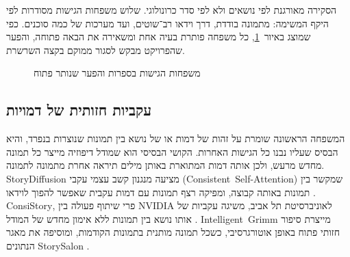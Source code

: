 הסקירה מאורגנת לפי נושאים ולא לפי סדר כרונולוגי. שלוש משפחות הגישות מסודרות לפי היקף המשימה: מתמונה בודדת, דרך וידאו רב־שוטים, ועד מערכות של כמה סוכנים. כפי שמוצג באיור~\ref{fig:ch3-families}, כל משפחה פותרת בעיה אחת ומשאירה את הבאה פתוחה, והפער שהפרויקט מבקש לסגור ממוקם בקצה השרשרת.

\begin{figure}[h]
  \centering
  \caption{משפחות הגישות בספרות והפער שנותר פתוח}
  \label{fig:ch3-families}
\end{figure}

\subsection{עקביות חזותית של דמויות}
המשפחה הראשונה שומרת על זהות של דמות או של נושא בין תמונות שנוצרות בנפרד, והיא הבסיס שעליו נבנו כל הגישות האחרות. הקושי הבסיסי הוא שמודל דיפוזיה מייצר כל תמונה מחדש מרעש, ולכן אותה דמות המתוארת באותן מילים תיראה אחרת מתמונה לתמונה. \textenglish{StoryDiffusion} מציעה מנגנון קשב עצמי עקבי (\mbox{\textenglish{Consistent Self-Attention}}) שמקשר בין תמונות באותה קבוצה, ומפיקה רצף תמונות עם דמות עקבית שאפשר להפוך לוידאו \cite{zhou2024storydiffusion}. \textenglish{ConsiStory}, פרי שיתוף פעולה בין \textenglish{NVIDIA} לאוניברסיטת תל אביב, משיגה עקביות של אותו נושא בין תמונות ללא אימון מחדש של המודל \cite{tewel2024consistory}. \mbox{\textenglish{Intelligent Grimm}} מייצרת סיפור חזותי פתוח באופן אוטורגרסיבי, כשכל תמונה מותנית בתמונות הקודמות, ומוסיפה את מאגר הנתונים \textenglish{StorySalon} \cite{liu2024grimm}.

